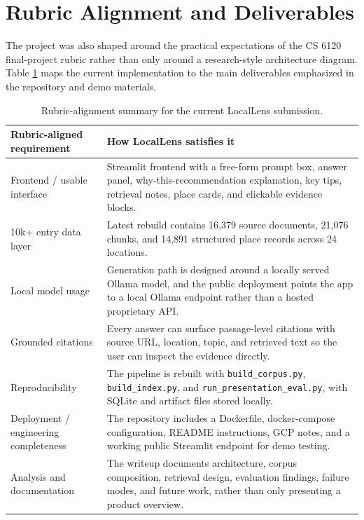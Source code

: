 \documentclass[11pt]{article}
\begin{document}
\section{Rubric Alignment and Deliverables}
The project was also shaped around the practical expectations of the CS 6120 final-project rubric rather than only around a research-style architecture diagram. Table \ref{tab:rubric} maps the current implementation to the main deliverables emphasized in the repository and demo materials.

\begin{table}[H]
\centering
\caption{Rubric-alignment summary for the current LocalLens submission.}
\label{tab:rubric}
\small
\begin{tabularx}{\textwidth}{>{\raggedright\arraybackslash}p{} >{\raggedright\arraybackslash}X}
\toprule
Rubric-aligned requirement & How LocalLens satisfies it \\
\midrule
Frontend / usable interface & Streamlit frontend with a free-form prompt box, answer panel, why-this-recommendation explanation, key tips, retrieval notes, place cards, and clickable evidence blocks. \\
10k+ entry data layer & Latest rebuild contains 16,379 source documents, 21,076 chunks, and 14,891 structured place records across 24 locations. \\
Local model usage & Generation path is designed around a locally served Ollama model, and the public deployment points the app to a local Ollama endpoint rather than a hosted proprietary API. \\
Grounded citations & Every answer can surface passage-level citations with source URL, location, topic, and retrieved text so the user can inspect the evidence directly. \\
Reproducibility & The pipeline is rebuilt with \texttt{build\_corpus.py}, \texttt{build\_index.py}, and \texttt{run\_presentation\_eval.py}, with SQLite and artifact files stored locally. \\
Deployment / engineering completeness & The repository includes a Dockerfile, docker-compose configuration, README instructions, GCP notes, and a working public Streamlit endpoint for demo testing. \\
Analysis and documentation & The writeup documents architecture, corpus composition, retrieval design, evaluation findings, failure modes, and future work, rather than only presenting a product overview. \\
\bottomrule
\end{tabularx}
\end{table}
\end{document}
